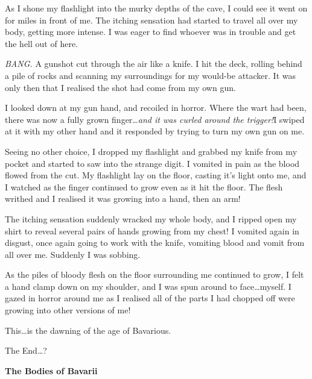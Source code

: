 As I shone my flashlight into the murky depths of the cave, I could
see it went on for miles in front of me. The itching sensation had
started to travel all over my body, getting more intense. I was
eager to find whoever was in trouble and get the hell out of
here.



{\em BANG.} A gunshot cut through the air like a knife. I hit the
deck, rolling behind a pile of rocks and scanning my surroundings
for my would-be attacker. It was only then that I realised the shot
had come from my own gun.



I looked down at my gun hand, and recoiled in horror. Where the
wart had been, there was now a fully grown finger{\ldots}{\em and it was
curled around the trigger!}I swiped at it with my other hand and
it responded by trying to turn my own gun on me.



Seeing no other choice, I dropped my flashlight and grabbed my
knife from my pocket and started to saw into the strange digit. I
vomited in pain as the blood flowed from the cut. My flashlight lay
on the floor, casting it's light onto me, and I watched as the
finger continued to grow even as it hit the floor. The flesh
writhed and I realised it was growing into a hand, then an
arm!



The itching sensation suddenly wracked my whole body, and I ripped
open my shirt to reveal several pairs of hands growing from my
chest! I vomited again in disgust, once again going to work with
the knife, vomiting blood and vomit from all over me. Suddenly I
was sobbing.



As the piles of bloody flesh on the floor surrounding me continued
to grow, I felt a hand clamp down on my shoulder, and I was spun
around to face{\ldots}myself. I gazed in horror around me as I realised
all of the parts I had chopped off were growing into other versions
of me!



This{\ldots}is the dawning of the age of Bavarious.



The End{\ldots}? 
 





{\bf The Bodies of Bavarii}



